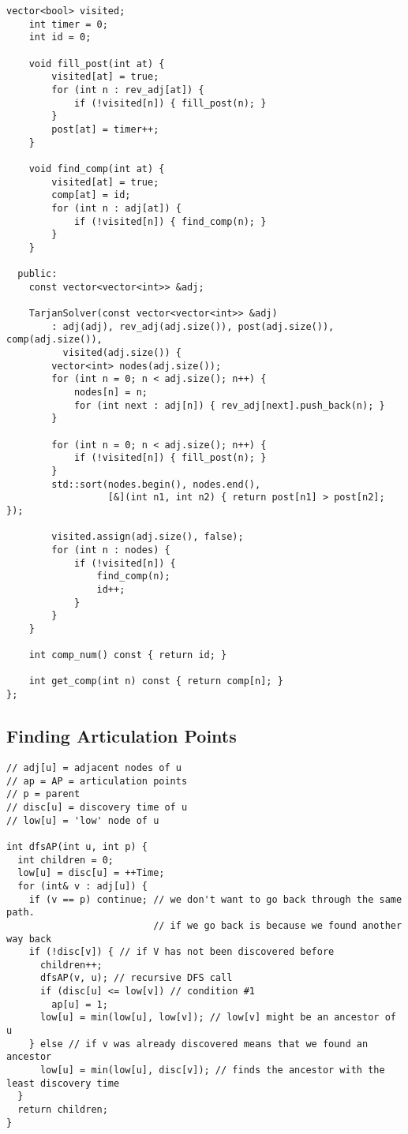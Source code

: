 \documentclass[10pt]{article}
\begin{document}
\begin{multicols*}{2}
\begin{lstlisting}[style=compactcpp]
	vector<bool> visited;
	int timer = 0;
	int id = 0;

	void fill_post(int at) {
		visited[at] = true;
		for (int n : rev_adj[at]) {
			if (!visited[n]) { fill_post(n); }
		}
		post[at] = timer++;
	}

	void find_comp(int at) {
		visited[at] = true;
		comp[at] = id;
		for (int n : adj[at]) {
			if (!visited[n]) { find_comp(n); }
		}
	}

  public:
	const vector<vector<int>> &adj;

	TarjanSolver(const vector<vector<int>> &adj)
	    : adj(adj), rev_adj(adj.size()), post(adj.size()), comp(adj.size()),
	      visited(adj.size()) {
		vector<int> nodes(adj.size());
		for (int n = 0; n < adj.size(); n++) {
			nodes[n] = n;
			for (int next : adj[n]) { rev_adj[next].push_back(n); }
		}

		for (int n = 0; n < adj.size(); n++) {
			if (!visited[n]) { fill_post(n); }
		}
		std::sort(nodes.begin(), nodes.end(),
		          [&](int n1, int n2) { return post[n1] > post[n2]; });

		visited.assign(adj.size(), false);
		for (int n : nodes) {
			if (!visited[n]) {
				find_comp(n);
				id++;
			}
		}
	}

	int comp_num() const { return id; }

	int get_comp(int n) const { return comp[n]; }
};
\end{lstlisting}

\subsection{Finding Articulation Points}

\begin{lstlisting}[style=compactcpp]
// adj[u] = adjacent nodes of u
// ap = AP = articulation points
// p = parent
// disc[u] = discovery time of u
// low[u] = 'low' node of u

int dfsAP(int u, int p) {
  int children = 0;
  low[u] = disc[u] = ++Time;
  for (int& v : adj[u]) {
    if (v == p) continue; // we don't want to go back through the same path.
                          // if we go back is because we found another way back
    if (!disc[v]) { // if V has not been discovered before
      children++;
      dfsAP(v, u); // recursive DFS call
      if (disc[u] <= low[v]) // condition #1
        ap[u] = 1;
      low[u] = min(low[u], low[v]); // low[v] might be an ancestor of u
    } else // if v was already discovered means that we found an ancestor
      low[u] = min(low[u], disc[v]); // finds the ancestor with the least discovery time
  }
  return children;
}


\end{lstlisting}
\end{multicols*}
\end{document}
